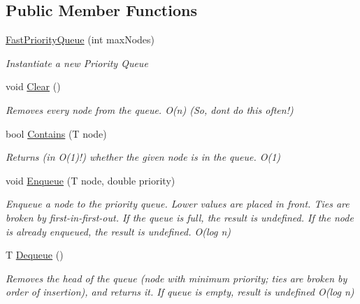 \subsection*{Public Member Functions}
\begin{DoxyCompactItemize}
\item 
\hyperlink{class_priority___queue_1_1_fast_priority_queue_a9b36491841ecaf15f8253a14a4050e0b}{Fast\+Priority\+Queue} (int max\+Nodes)
\begin{DoxyCompactList}\small\item\em Instantiate a new Priority Queue \end{DoxyCompactList}\item 
void \hyperlink{class_priority___queue_1_1_fast_priority_queue_a2e6712e62f3f64596884f35d6fec4441}{Clear} ()
\begin{DoxyCompactList}\small\item\em Removes every node from the queue. O(n) (So, don\textquotesingle{}t do this often!) \end{DoxyCompactList}\item 
bool \hyperlink{class_priority___queue_1_1_fast_priority_queue_ac7ed1c55afc22b9f492576675d0651c7}{Contains} (T node)
\begin{DoxyCompactList}\small\item\em Returns (in O(1)!) whether the given node is in the queue. O(1) \end{DoxyCompactList}\item 
void \hyperlink{class_priority___queue_1_1_fast_priority_queue_a9338584620111d3a2f0dc429e197be1a}{Enqueue} (T node, double priority)
\begin{DoxyCompactList}\small\item\em Enqueue a node to the priority queue. Lower values are placed in front. Ties are broken by first-\/in-\/first-\/out. If the queue is full, the result is undefined. If the node is already enqueued, the result is undefined. O(log n) \end{DoxyCompactList}\item 
T \hyperlink{class_priority___queue_1_1_fast_priority_queue_ac1b1d19f0769e01956cdcb1fbd5f08ac}{Dequeue} ()
\begin{DoxyCompactList}\small\item\em Removes the head of the queue (node with minimum priority; ties are broken by order of insertion), and returns it. If queue is empty, result is undefined O(log n) \end{DoxyCompactList}\item 

\end{DoxyCompactItemize}
